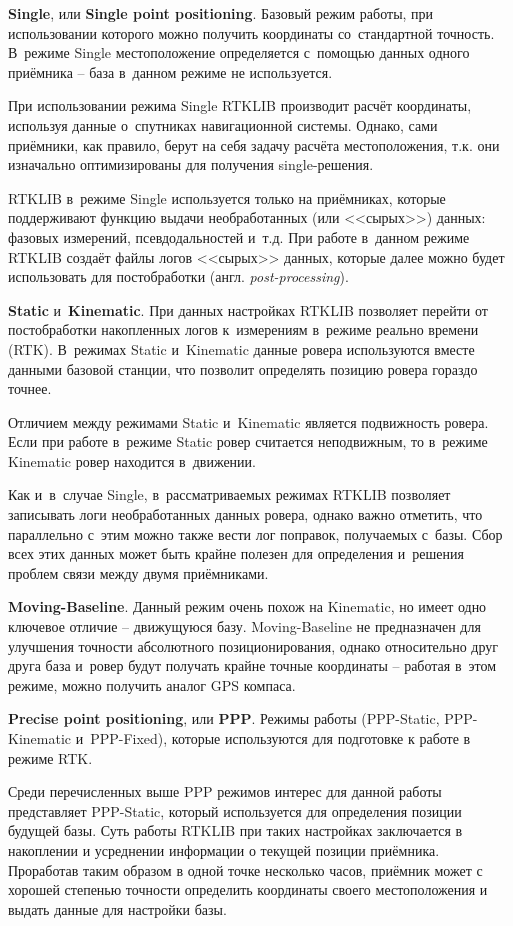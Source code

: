 \begin{dashitemize}
  \item \textbf{Single}, или \textbf{Single point positioning}. Базовый режим работы, при использовании которого можно получить координаты со~стандартной точность. В~режиме Single местоположение определяется с~помощью данных одного приёмника -- база в~данном режиме не используется. \par
  При использовании режима Single RTKLIB производит расчёт координаты, используя данные о~спутниках навигационной системы. Однако, сами приёмники, как правило, берут на себя задачу расчёта местоположения, т.к. они изначально оптимизированы для получения single-решения. \par
  RTKLIB в~режиме Single используется только на приёмниках, которые поддерживают функцию выдачи необработанных (или <<сырых>>) данных: фазовых измерений, псевдодальностей и~т.д. При работе в~данном режиме RTKLIB создаёт файлы логов <<сырых>> данных, которые далее можно будет использовать для постобработки (англ. \emph{post-processing}).
  \item \textbf{Static} и~\textbf{Kinematic}. При данных настройках RTKLIB позволяет перейти от постобработки накопленных логов к~измерениям в~режиме реально времени (RTK). В~режимах Static и~Kinematic данные ровера используются вместе данными базовой станции, что позволит определять позицию ровера гораздо точнее. \par
  Отличием между режимами Static и~Kinematic является подвижность ровера. Если при работе в~режиме Static ровер считается неподвижным, то в~режиме Kinematic ровер находится в~движении. \par
  Как и~в~случае Single, в~рассматриваемых режимах RTKLIB позволяет записывать логи необработанных данных ровера, однако важно отметить, что параллельно с~этим можно также вести лог поправок, получаемых с~базы. Сбор всех этих данных может быть крайне полезен для определения и~решения проблем связи между двумя приёмниками.
  \item \textbf{Moving-Baseline}. Данный режим очень похож на Kinematic, но имеет одно ключевое отличие -- движущуюся базу. Moving-Baseline не предназначен для улучшения точности абсолютного позиционирования, однако относительно друг друга база и~ровер будут получать крайне точные координаты -- работая в~этом режиме, можно получить аналог GPS компаса.
  \item \textbf{Precise point positioning}, или \textbf{PPP}. Режимы работы (PPP-Static, PPP-Kinematic и~PPP-Fixed), которые используются для подготовке к работе в режиме RTK. \par
  Среди перечисленных выше PPP режимов интерес для данной работы представляет PPP-Static, который используется для определения позиции будущей базы. Суть работы RTKLIB при таких настройках заключается в накоплении и усреднении информации о текущей позиции приёмника. Проработав таким образом в одной точке несколько часов, приёмник может с хорошей степенью точности определить координаты своего местоположения и выдать данные для настройки базы.
\end{dashitemize}


